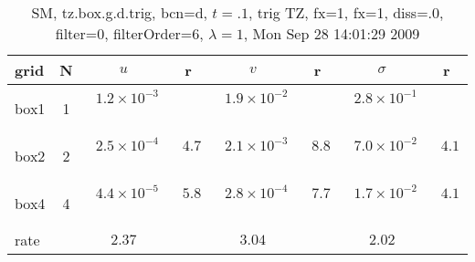 \begin{table}[hbt]\tableFont %
\begin{center}
\begin{tabular}{|l|c|c|c|c|c|c|c|} \hline 
grid  & N &  $u$  & r &  $v$  & r &  $\sigma$   & r \\ \hline 
                box1 &     1 & ~$1.2\times10^{ -3}$~ &           & ~$1.9\times10^{ -2}$~ &           & ~$2.8\times10^{ -1}$~ &            \\ \hline
                box2 &     2 & ~$2.5\times10^{ -4}$~ & ~$  4.7$~ & ~$2.1\times10^{ -3}$~ & ~$  8.8$~ & ~$7.0\times10^{ -2}$~ & ~$  4.1$~  \\ \hline
                box4 &     4 & ~$4.4\times10^{ -5}$~ & ~$  5.8$~ & ~$2.8\times10^{ -4}$~ & ~$  7.7$~ & ~$1.7\times10^{ -2}$~ & ~$  4.1$~  \\ \hline
    rate             &       &       $2.37$         &       &       $3.04$         &       &       $2.02$         &        \\ \hline
\end{tabular}
\caption{SM, tz.box.g.d.trig, bcn=d, $t=.1$, trig TZ, fx=1, fx=1, diss=.0, filter=0, filterOrder=6, $\lambda=1$, Mon Sep 28 14:01:29 2009}\label{table:tz.box.g.d.trig}
\end{center}
\end{table}
